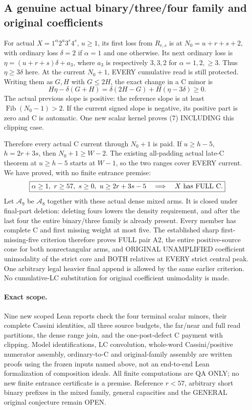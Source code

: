\subsection{A genuine actual binary/three/four family and original coefficients}
For actual $X=1^\alpha2^u3^r4^s$, $u\ge1$, its first loss from
$R_{r,s}$ is at $N_0=u+r+s+2$, with ordinary loss
$\delta=2$ if $\alpha=1$ and one otherwise. Its next ordinary
loss is $\eta=(u+r+s)\delta+a_3$, where $a_3$ is respectively
$3,3,2$ for $\alpha=1,2,\ge3$. Thus $\eta\ge3\delta$ here.
At the current $N_0+1$, EVERY cumulative read is still protected.
Writing them as $G,H$ with $G\le2H$, the exact change in a C minor is
\[
 H\eta-\delta(G+H)=\delta(2H-G)+H(\eta-3\delta)\ge0.   \tag{7}
\]
The actual previous slope is positive: the reference slope is at
least $\operatorname{Fib}(N_0-1)>2$. If the current signed slope
is negative, its positive part is zero and C is automatic.
One new scalar kernel proves (7) INCLUDING this clipping case.

Therefore every actual C current through $N_0+1$ is paid.
If $u\ge h-5$, $h=2r+3s$, then $N_0+1\ge W-2$.
The existing all-padding actual late-C theorem at $u\ge h-5$
starts at $W-1$, so the two ranges cover EVERY current.
We have proved, with no finite entrance premise:
\[
 \boxed{\alpha\ge1,\ r\ge57,\ s\ge0,\ u\ge2r+3s-5
       \quad\Longrightarrow\quad X\hbox{ has FULL C}.}
\]
Let $\mathcal A_9$ be $\mathcal A_8$ together with these actual
dense mixed arms. It is closed under final-part deletion: deleting
fours lowers the density requirement, and after the last four the
entire binary/three family is already present. Every member has
complete C and first missing weight at most five. The established
sharp first-missing-five criterion therefore proves FULL pair A2,
the entire positive-source cone for both nonrectangular arms, and
ORIGINAL UNAMPLIFIED coefficient unimodality of the strict core
and BOTH relatives at EVERY strict central peak. One arbitrary
legal heavier final append is allowed by the same earlier criterion.
No cumulative-LC substitution for original coefficient unimodality is made.

\paragraph{Exact scope.}
Nine new scoped Lean reports check the four terminal scalar minors,
their complete Cassini identities, all three source budgets, the
far/near and full read partitions, the dense range join, and the
one-post-defect C payment with clipping. Model identifications,
LC convolution, whole-word Cassini/positive numerator assembly,
ordinary-to-C and original-family assembly are written proofs using
the frozen inputs named above, not an end-to-end Lean formalization
of composition ideals. All finite computations are QA ONLY; no new
finite entrance certificate is a premise. Reference $r<57$, arbitrary
short binary prefixes in the mixed family, general capacities and
the GENERAL original conjecture remain OPEN.
